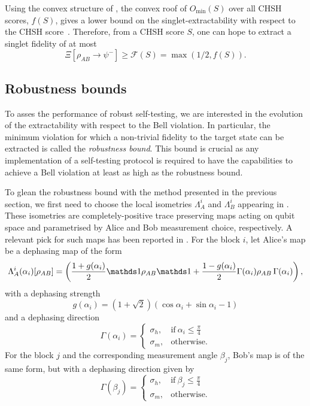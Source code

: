 Using the convex structure of , the convex roof of $O_{\min}(S)$ over all CHSH scores, $f(S)$, gives a lower bound on the singlet-extractability with respect to the CHSH score~\cite{Sekatski2018}.
Therefore, from a CHSH score $S$, one can hope to extract a singlet fidelity of at most 
\begin{equation}
	\Xi [\rho_{AB} \rightarrow \psi^{-}] \geq \mathcal{F}(S)=\max\left(1/2, f(S)\right).
\end{equation}

\subsection{Robustness bounds}

To asses the performance of robust self-testing, we are interested in the evolution of the extractability with respect to the Bell violation.
In particular, the minimum violation for which a non-trivial fidelity to the target state can be extracted is called the \textit{robustness bound}.
This bound is crucial as any implementation of a self-testing protocol is required to have the capabilities to achieve a Bell violation at least as high as the robustness bound.

To glean the robustness bound with the method presented in the previous section, we first need to choose the local isometries $\Lambda_A^i$ and $\Lambda_B^i$ appearing in .
These isometries are completely-positive trace preserving maps acting on qubit space and parametrised by Alice and Bob measurement choice, respectively.
A relevant pick for such maps has been reported in \cite{Kaniewski2016}.
For the block $i$, let Alice's map be a dephasing map of the form
\begin{equation}
	\Lambda_A^i(\alpha_i)[\rho_{AB}] = \left( \frac{1+g(\alpha_i)}{2}\id\rho_{AB}\id+\frac{1-g(\alpha_i)}{2}\Gamma(\alpha_i)\rho_{AB}\,\Gamma(\alpha_i)\right),
	\label{eq:dephasing_maps}
\end{equation}
with a dephasing strength
\begin{equation}
	g(\alpha_i)=(1+\sqrt{2})(\cos{\alpha_i}+\sin{\alpha_i}-1)
	\label{eq:dephasing_strength}
\end{equation}
and a dephasing direction
\begin{equation}
	\Gamma(\alpha_i) = \begin{cases}
      \sigma_h, & \text{if}\ \alpha_i\leq\frac{\pi}{4} \\
      \sigma_m, & \text{otherwise}.
    \end{cases}
	\label{eq:dephasing_direction_alice}
\end{equation}
For the block $j$ and the corresponding measurement angle $\beta_j$, Bob's map is of the same form, but with a dephasing direction given by
\begin{equation}
	\Gamma(\beta_j) = \begin{cases}
      \sigma_h, & \text{if}\ \beta_j\leq\frac{\pi}{4} \\
      \sigma_m, & \text{otherwise}.
    \end{cases}
	\label{eq:dephasing_direction_bob}
\end{equation}

